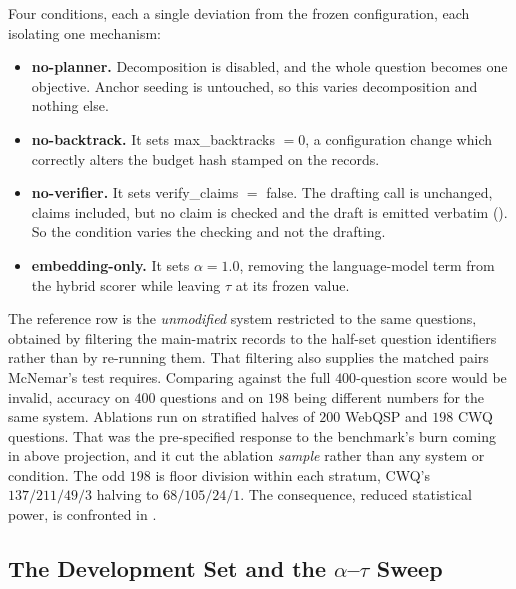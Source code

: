 Four conditions, each a single deviation from the frozen configuration, each
isolating one mechanism:

\begin{itemize}
  \item \textbf{no-planner.} Decomposition is disabled, and the whole question
becomes one objective. Anchor seeding is untouched, so this varies decomposition
and nothing else.
  \item \textbf{no-backtrack.} It sets \textsf{max\_backtracks} $= 0$, a
configuration change which correctly alters the budget hash stamped on the
records.
  \item \textbf{no-verifier.} It sets \textsf{verify\_claims} $=$ false. The
drafting call is unchanged, claims included, but no claim is checked and the
draft is emitted verbatim (). So the condition varies the
checking and not the drafting.
  \item \textbf{embedding-only.} It sets $\alpha = 1.0$, removing the
language-model term from the hybrid scorer while leaving $\tau$ at its frozen
value.
\end{itemize}

The reference row is the \emph{unmodified} system restricted to the same
questions, obtained by filtering the main-matrix records to the half-set
question identifiers rather than by re-running them. That filtering also
supplies the matched pairs McNemar's test requires. Comparing against the full
$400$-question score would be invalid, accuracy on $400$ questions and on $198$
being different numbers for the same system. Ablations run on stratified halves
of $200$ WebQSP and $198$ CWQ questions. That was the pre-specified response to
the benchmark's burn coming in above projection, and it cut the ablation
\emph{sample} rather than any system or condition. The odd $198$ is floor
division within each stratum, CWQ's $137/211/49/3$ halving to $68/105/24/1$. The
consequence, reduced statistical power, is confronted in .

\subsection{The Development Set and the
\texorpdfstring{$\alpha$--$\tau$}{alpha-tau} Sweep}\label{sec:hyperparams}


